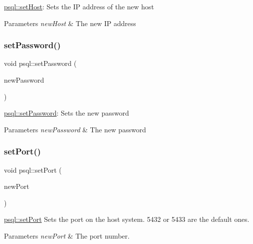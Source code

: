 \mbox{\hyperlink{classpsql_a96b3b9483f1a642c026d4b5cf505eb75}{psql\+::set\+Host}}\+: Sets the IP address of the new host 


\begin{DoxyParams}{Parameters}
{\em new\+Host} & The new IP address \\
\hline
\end{DoxyParams}
\mbox{\label{classpsql_a6c29350037550b7e5a5bb8f439c405f3}} 
\subsubsection{\texorpdfstring{setPassword()}{setPassword()}}
{\footnotesize\ttfamily void psql\+::set\+Password (\begin{DoxyParamCaption}\item[{Q\+String}]{new\+Password }\end{DoxyParamCaption})}



\mbox{\hyperlink{classpsql_a6c29350037550b7e5a5bb8f439c405f3}{psql\+::set\+Password}}\+: Sets the new password 


\begin{DoxyParams}{Parameters}
{\em new\+Password} & The new password \\
\hline
\end{DoxyParams}
\mbox{\label{classpsql_a62447c990c5c9f8deb6b8f6497117bfc}} 
\subsubsection{\texorpdfstring{setPort()}{setPort()}}
{\footnotesize\ttfamily void psql\+::set\+Port (\begin{DoxyParamCaption}\item[{int}]{new\+Port }\end{DoxyParamCaption})}



\mbox{\hyperlink{classpsql_a62447c990c5c9f8deb6b8f6497117bfc}{psql\+::set\+Port}} Sets the port on the host system. 5432 or 5433 are the default ones. 


\begin{DoxyParams}{Parameters}
{\em new\+Port} & The port number. \\
\hline
\end{DoxyParams}
\mbox{\label{classpsql_a1488a9e4909abd172651b7be240342cb}} 
